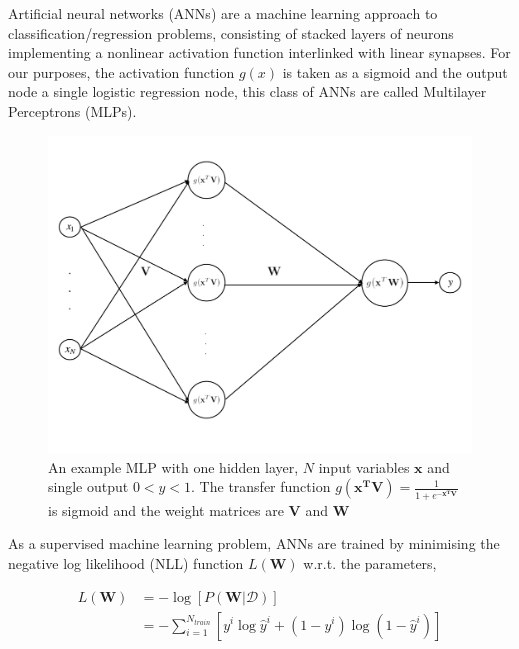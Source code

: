 
Artificial neural networks (ANNs) are a machine learning approach to classification/regression problems, consisting of stacked layers of neurons implementing a nonlinear activation function interlinked with linear synapses. 
For our purposes, the activation function $g(x)$ is taken as a sigmoid and the output node a single logistic regression node, this class of ANNs are called Multilayer Perceptrons (MLPs). 

\begin{figure}[htbp]
	\centering
		\includegraphics[width=0.7\linewidth]{img/ann_diag}
	\caption{An example MLP with one hidden layer, $N$ input variables $\mathbf{x}$ and single output $ 0 < y < 1$. The transfer function  $ g(\mathbf{x^T V}) = \frac{1}{1+e^{-\mathbf{x^TV}}}$  is sigmoid and the weight matrices are \textbf{V} and \textbf{W} }
	\label{ann_diag}
\end{figure}  

As a supervised machine learning problem, ANNs are trained by minimising the negative log likelihood (NLL) function $L(\mathbf{W})$ w.r.t. the parameters, 

\begin{align}
	L(\mathbf{W}) &= -\log\left[ P(\mathbf{W} | \mathcal{D}) \right] \\
				  &= -\sum_{i = 1}^{N_{train}} \left[ y^i\log \hat{y}^i + (1-y^i)\log(1-\hat{y}^i)\right]
\end{align}

